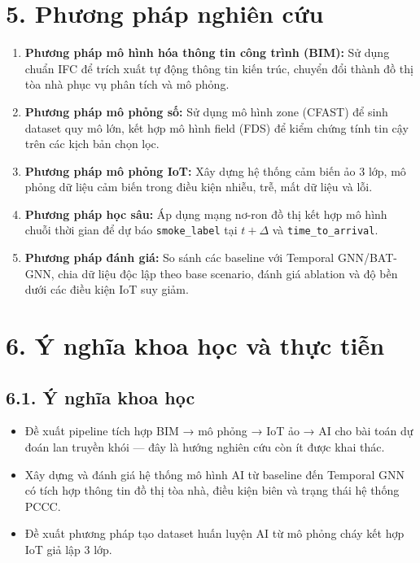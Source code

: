 \section*{5. Phương pháp nghiên cứu}

\begin{enumerate}
  \item \textbf{Phương pháp mô hình hóa thông tin công trình (BIM):} Sử dụng chuẩn IFC để trích xuất tự động thông tin kiến trúc, chuyển đổi thành đồ thị tòa nhà phục vụ phân tích và mô phỏng.
  \item \textbf{Phương pháp mô phỏng số:} Sử dụng mô hình zone (CFAST) để sinh dataset quy mô lớn, kết hợp mô hình field (FDS) để kiểm chứng tính tin cậy trên các kịch bản chọn lọc.
  \item \textbf{Phương pháp mô phỏng IoT:} Xây dựng hệ thống cảm biến ảo 3 lớp, mô phỏng dữ liệu cảm biến trong điều kiện nhiễu, trễ, mất dữ liệu và lỗi.
  \item \textbf{Phương pháp học sâu:} Áp dụng mạng nơ-ron đồ thị kết hợp mô hình chuỗi thời gian để dự báo \texttt{smoke\_label} tại $t+\Delta$ và \texttt{time\_to\_arrival}.
  \item \textbf{Phương pháp đánh giá:} So sánh các baseline với Temporal GNN/BAT-GNN, chia dữ liệu độc lập theo base scenario, đánh giá ablation và độ bền dưới các điều kiện IoT suy giảm.
\end{enumerate}

\section*{6. Ý nghĩa khoa học và thực tiễn}

\subsection*{6.1. Ý nghĩa khoa học}

\begin{itemize}
  \item Đề xuất pipeline tích hợp BIM → mô phỏng → IoT ảo → AI cho bài toán dự đoán lan truyền khói — đây là hướng nghiên cứu còn ít được khai thác.
  \item Xây dựng và đánh giá hệ thống mô hình AI từ baseline đến Temporal GNN có tích hợp thông tin đồ thị tòa nhà, điều kiện biên và trạng thái hệ thống PCCC.
  \item Đề xuất phương pháp tạo dataset huấn luyện AI từ mô phỏng cháy kết hợp IoT giả lập 3 lớp.
\end{itemize}

